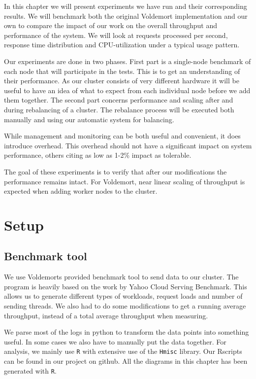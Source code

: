 

In this chapter we will present experiments we have run and their corresponding results. We will benchmark both the original Voldemort implementation and our own to compare the impact of our work on the overall throughput and performance of the system. We will look at requests processed per second, response time distribution and CPU-utilization under a typical usage pattern. 

Our experiments are done in two phases. First part is a single-node benchmark of each node that will participate in the tests. This is to get an understanding of their performance. As our cluster consists of very different hardware it will be useful to have an idea of what to expect from each individual node before we add them together.
The second part concerns performance and scaling after and during rebalancing of a cluster. The rebalance process will be executed both manually and using our automatic system for balancing.

While management and monitoring can be both useful and convenient, it does introduce overhead. This overhead should not have a significant impact on system performance, others citing as low as 1-2\% impact as tolerable.

The goal of these experiments is to verify that after our modifications the performance remains intact. For Voldemort, near linear scaling of throughput is expected when adding worker nodes to the cluster. 

\section{Setup}
\subsection{Benchmark tool}
We use Voldemorts provided benchmark tool to send data to our cluster. The program is heavily based on the work by Yahoo Cloud Serving Benchmark\cite{ycsb}. This allows us to generate different types of workloads, request loads and number of sending threads. We also had to do some modifications to get a running average throughput, instead of a total average throughput when measuring.

We parse most of the logs in python to transform the data points into something useful. In some cases we also have to manually put the data together.
For analysis, we mainly use \texttt{R}\cite{Rproject} with extensive use of the \texttt{Hmisc}\cite{Hmisc} library. Our Rscripts can be found in our project on github\cite{githubproject}. All the diagrams in this chapter has been generated with \texttt{R}.

